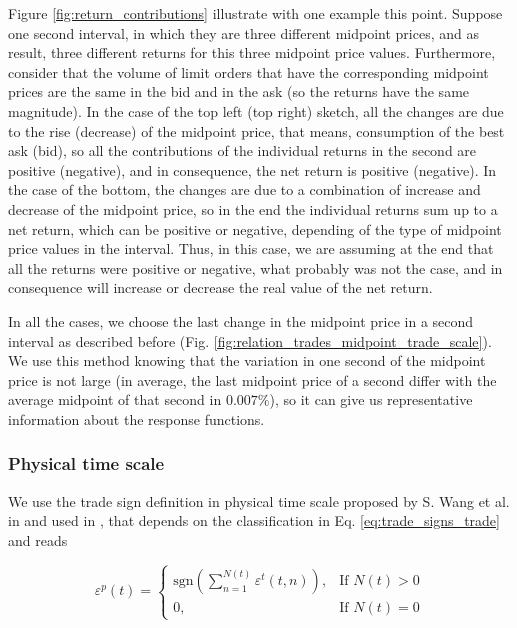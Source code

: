 Figure \ref{fig:return_contributions} illustrate with one example this point.
Suppose one second interval, in which they are three different midpoint prices,
and as result, three different returns for this three midpoint price
values. Furthermore, consider that the volume of limit orders that have the
corresponding midpoint prices are the same in the bid and in the ask (so the
returns have the same magnitude). In the case of the top left (top right)
sketch, all the changes are due to the rise (decrease) of the midpoint price,
that means, consumption of the best ask (bid), so all the contributions of the
individual returns in the second are positive (negative), and in consequence,
the net return is positive (negative). In the case of the bottom, the changes
are due to a combination of increase and decrease of the midpoint price, so in
the end the individual returns sum up to a net return, which can be positive or
negative, depending of the type of midpoint price values in the interval. Thus,
in this case, we are assuming at the end that all the returns were positive or
negative, what probably was not the case, and in consequence will increase or
decrease the real value of the net return.

In all the cases, we choose the last change in the midpoint price in a second
interval as described before
(Fig. \ref{fig:relation_trades_midpoint_trade_scale}). We use this method
knowing that the variation in one second of the midpoint price is not large
(in average, the last midpoint price of a second differ with the average
midpoint of that second in $0.007\%$), so it can give us representative
information about the response functions.

\subsubsection{Physical time scale}\label{subsubsec:physical_time}

We use the trade sign definition in physical time scale proposed by
S. Wang et al. in \cite{Wang_2016_cross} and used in
\cite{Wang_2017,Wang_2016_avg}, that depends on the classification in
Eq. \ref{eq:trade_signs_trade} and reads

\begin{equation}\label{eq:trade_signs_physical}
    \varepsilon^{p}\left(t\right)=\left\{
    \begin{array}{cc}
    \text{sgn}\left(\sum_{n=1}^{N\left(t\right)}\varepsilon^{t}
    \left(t,n\right)\right),
    & \text{If }N \left(t\right)>0\\
    0, & \text{If }N\left(t\right)=0
    \end{array}\right.
\end{equation}

